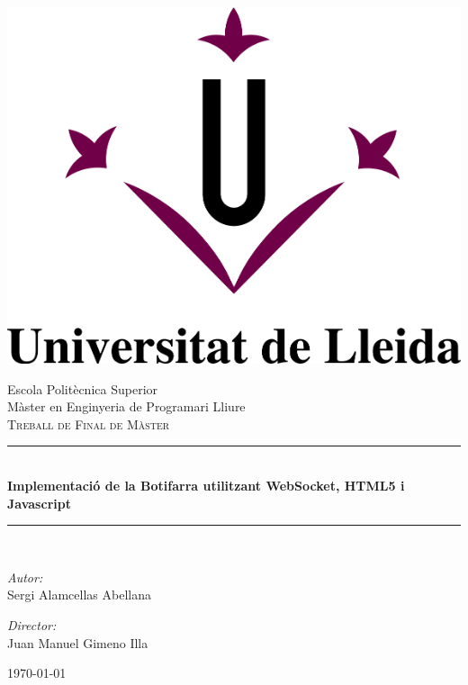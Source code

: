 \begin{titlepage}
\begin{center} 

\includegraphics{img/M-UdL_rs.png}

{\selectfont\Large Escola Politècnica Superior}\\[1.5cm]   %
\Large Màster en Enginyeria de Programari Lliure\\[3mm]
\textsc{\LARGE Treball de Final de Màster}\\[1.5cm]

\rule{\linewidth}{1.5pt} \\[7mm]

{\huge \bf Implementació de la Botifarra utilitzant WebSocket, HTML5 i Javascript } \\[2mm]
\rule{\linewidth}{1.5pt} \\[1cm]
\large
\begin{minipage}{0.49\textwidth}
\textsl{Autor:}\\Sergi Alamcellas Abellana
\end{minipage}
\begin{minipage}{0.49\textwidth}\begin{flushright}
\textsl{Director:}\\Juan Manuel Gimeno Illa 
\end{flushright}\end{minipage}

\vfill\today

\end{center}
\end{titlepage}
